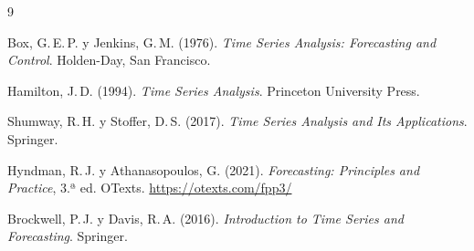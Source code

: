 \documentclass[12pt, a4paper]{article}
\begin{document}
\begin{thebibliography}{9}

Box, G.\,E.\,P. y Jenkins, G.\,M. (1976).
\textit{Time Series Analysis: Forecasting and Control}.
Holden-Day, San Francisco.

Hamilton, J.\,D. (1994).
\textit{Time Series Analysis}.
Princeton University Press.

Shumway, R.\,H. y Stoffer, D.\,S. (2017).
\textit{Time Series Analysis and Its Applications}.
Springer.

Hyndman, R.\,J. y Athanasopoulos, G. (2021).
\textit{Forecasting: Principles and Practice}, 3.ª ed.
OTexts. \url{https://otexts.com/fpp3/}

Brockwell, P.\,J. y Davis, R.\,A. (2016).
\textit{Introduction to Time Series and Forecasting}.
Springer.

\end{thebibliography}
\end{document}

